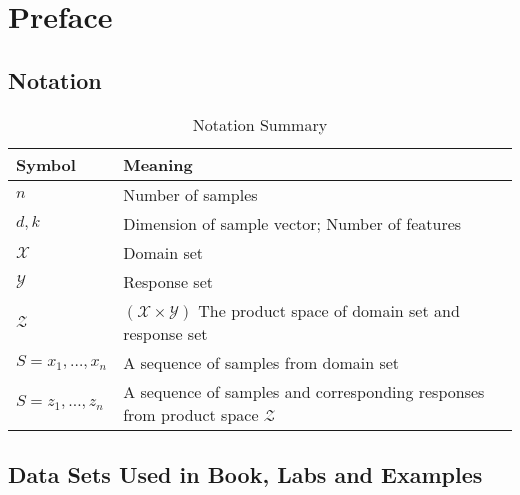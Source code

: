 \section{Preface}

\subsection{Notation}

\begin{table}[h!]
	\begin{center}
		\caption{Notation Summary}
		\label{tab:notation}
		\begin{tabular}{l|l}
			\textbf{Symbol} & \textbf{Meaning} \\
			\hline
			\hline
			$n$ & Number of samples \\
			$d, k$ & Dimension of sample vector; Number of features \\
			$\mathcal{X}$ & Domain set \\
			$\mathcal{Y}$ & Response set \\
			$\mathcal{Z}$ & $\left(\mathcal{X}\times\mathcal{Y}\right)$ The product space of domain set and response set\\
			$S=x_1,\ldots,x_n$ & A sequence of samples from domain set \\
			$S=z_1,\ldots,z_n$ & A sequence of samples and corresponding responses from product space $\mathcal{Z}$ \\
		\end{tabular}
	\end{center}
\end{table}

\subsection{Data Sets Used in Book, Labs and Examples}